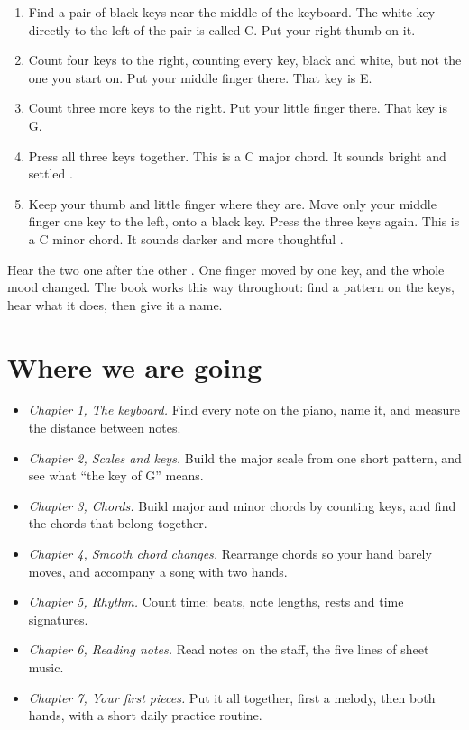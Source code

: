 \begin{enumerate}
  \item Find a pair of black keys near the middle of the keyboard. The white key directly to the left of the pair is called C. Put your right thumb on it.
  \item Count four keys to the right, counting every key, black and white, but not the one you start on. Put your middle finger there. That key is E.
  \item Count three more keys to the right. Put your little finger there. That key is G.
  \item Press all three keys together. This is a C major chord. It sounds bright and settled .
  \item Keep your thumb and little finger where they are. Move only your middle finger one key to the left, onto a black key. Press the three keys again. This is a C minor chord. It sounds darker and more thoughtful .
\end{enumerate}

Hear the two one after the other . One finger moved by one key, and the whole mood changed. The book works this way throughout: find a pattern on the keys, hear what it does, then give it a name.

\section*{Where we are going}

\begin{itemize}
  \item \emph{Chapter 1, The keyboard.} Find every note on the piano, name it, and measure the distance between notes.
  \item \emph{Chapter 2, Scales and keys.} Build the major scale from one short pattern, and see what ``the key of G'' means.
  \item \emph{Chapter 3, Chords.} Build major and minor chords by counting keys, and find the chords that belong together.
  \item \emph{Chapter 4, Smooth chord changes.} Rearrange chords so your hand barely moves, and accompany a song with two hands.
  \item \emph{Chapter 5, Rhythm.} Count time: beats, note lengths, rests and time signatures.
  \item \emph{Chapter 6, Reading notes.} Read notes on the staff, the five lines of sheet music.
  \item \emph{Chapter 7, Your first pieces.} Put it all together, first a melody, then both hands, with a short daily practice routine.
\end{itemize}

